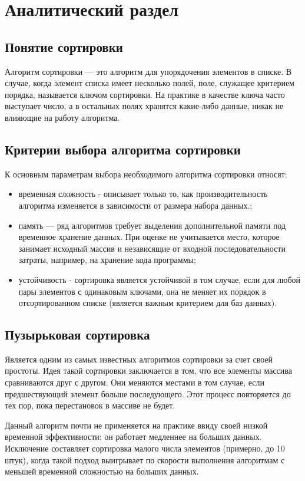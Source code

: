 \chapter{Аналитический раздел}

\section{Понятие сортировки}
Алгоритм сортировки — это алгоритм для упорядочения элементов в списке. В случае, когда элемент списка имеет несколько полей, поле, служащее критерием порядка, называется ключом сортировки. На практике в качестве ключа часто выступает число, а в остальных полях хранятся какие-либо данные, никак не влияющие на работу алгоритма.

\section{Критерии выбора алгоритма сортировки}
К основным параметрам выбора необходимого алгоритма сортировки относят:
\begin{itemize}
	\item временная сложность - описывает только то, как производительность алгоритма изменяется в зависимости от размера набора данных.;
	\item память — ряд алгоритмов требует выделения дополнительной памяти под временное хранение данных. При оценке не учитывается место, которое занимает исходный массив и независящие от входной последовательности затраты, например, на хранение кода программы;
	\item устойчивость - сортировка является устойчивой в том случае, если для любой пары элементов с одинаковым ключами, она не меняет их порядок в отсортированном списке (является важным критерием для баз данных).
\end{itemize} 

\section{Пузырьковая сортировка}
Является одним из самых известных алгоритмов сортировки за счет своей простоты. Идея такой сортировки заключается в том, что все элементы массива сравниваются друг с другом\cite{bubble}. Они меняются местами в том случае, если предшествующий элемент больше последующего. Этот процесс повторяется до тех пор, пока перестановок в массиве не будет.

Данный алгоритм почти не применяется на практике ввиду своей низкой временной эффективности: он работает медленнее на больших данных. Исключение составляет сортировка малого числа элементов (примерно, до 10 штук), когда такой подход выигрывает по скорости выполнения алгоритмам с меньшей временной сложностью на больших данных.

